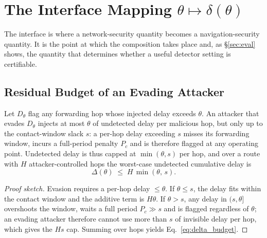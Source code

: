 \section{The Interface Mapping $\theta \mapsto \delta(\theta)$}
\label{sec:interface}
The interface is where a network-security quantity becomes a navigation-security
quantity. It is the point at which the composition takes place and, as
\S\ref{sec:eval} shows, the quantity that determines whether a useful detector
setting is certifiable.

\subsection{Residual Budget of an Evading Attacker}
\begin{lemma}
\label{lem:residual}
Let $D_\theta$ flag any forwarding hop whose injected delay exceeds $\theta$. An
attacker that evades $D_\theta$ injects at most $\theta$ of undetected delay per
malicious hop, but only up to the contact-window slack $s$: a per-hop delay
exceeding $s$ misses its forwarding window, incurs a full-period penalty
$P_{\!c}$ and is therefore flagged at any operating point. Undetected delay is
thus capped at $\min(\theta,s)$ per hop, and over a route with $H$
attacker-controlled hops the worst-case undetected cumulative delay is
\begin{equation}
\label{eq:delta_budget}
\Delta(\theta) \;\le\; H\,\min(\theta,\,s).
\end{equation}
\end{lemma}
\begin{proof}[Proof sketch]
Evasion requires a per-hop delay $\le\theta$. If $\theta\le s$, the delay fits
within the contact window and the additive term is $H\theta$. If $\theta>s$, any
delay in $(s,\theta]$ overshoots the window, waits a full period
$P_{\!c}\gg s$ and is flagged regardless of $\theta$; an evading attacker
therefore cannot use more than $s$ of invisible delay per hop, which gives the
$Hs$ cap. Summing over hops yields Eq.~\eqref{eq:delta_budget}.
\end{proof}

